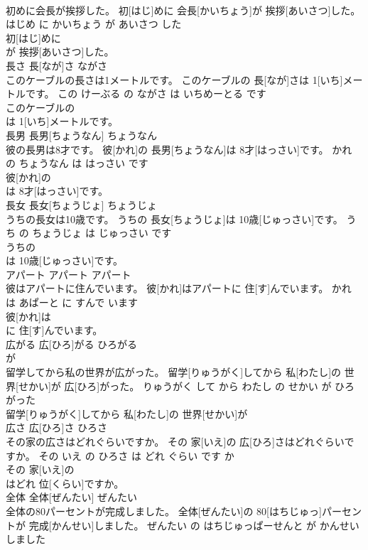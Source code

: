 \documentclass[8pt]{extreport}
\begin{document}
\begin{CJK}{UTF8}{min}
\\	初めに会長が挨拶した。	初[はじ]めに 会長[かいちょう]が 挨拶[あいさつ]した。	はじめ に かいちょう が あいさつ した	
\\	初[はじ]めに
\\	が 挨拶[あいさつ]した。		
\\	長さ	長[なが]さ	ながさ	
\\	このケーブルの長さは1メートルです。	このケーブルの 長[なが]さは 1[いち]メートルです。	この けーぶる の ながさ は いちめーとる です	
\\	このケーブルの
\\	は 1[いち]メートルです。		
\\	長男	長男[ちょうなん]	ちょうなん	
\\	彼の長男は8才です。	彼[かれ]の 長男[ちょうなん]は 8才[はっさい]です。	かれ の ちょうなん は はっさい です	
\\	彼[かれ]の
\\	は 8才[はっさい]です。		
\\	長女	長女[ちょうじょ]	ちょうじょ	
\\	うちの長女は10歳です。	うちの 長女[ちょうじょ]は 10歳[じゅっさい]です。	うち の ちょうじょ は じゅっさい です	
\\	うちの
\\	は 10歳[じゅっさい]です。		
\\	アパート	アパート	アパート	
\\	彼はアパートに住んでいます。	彼[かれ]はアパートに 住[す]んでいます。	かれ は あぱーと に すんで います	
\\	彼[かれ]は
\\	に 住[す]んでいます。		
\\	広がる	広[ひろ]がる	ひろがる	
\\	が		
\\	留学してから私の世界が広がった。	留学[りゅうがく]してから 私[わたし]の 世界[せかい]が 広[ひろ]がった。	りゅうがく して から わたし の せかい が ひろがった	
\\	留学[りゅうがく]してから 私[わたし]の 世界[せかい]が
\\	広さ	広[ひろ]さ	ひろさ	
\\	その家の広さはどれぐらいですか。	その 家[いえ]の 広[ひろ]さはどれぐらいですか。	その いえ の ひろさ は どれ ぐらい です か	
\\	その 家[いえ]の
\\	はどれ 位[くらい]ですか。		
\\	全体	全体[ぜんたい]	ぜんたい	
\\	全体の80パーセントが完成しました。	全体[ぜんたい]の 80[はちじゅっ]パーセントが 完成[かんせい]しました。	ぜんたい の はちじゅっぱーせんと が かんせい しました	

\end{CJK}
\end{document}
